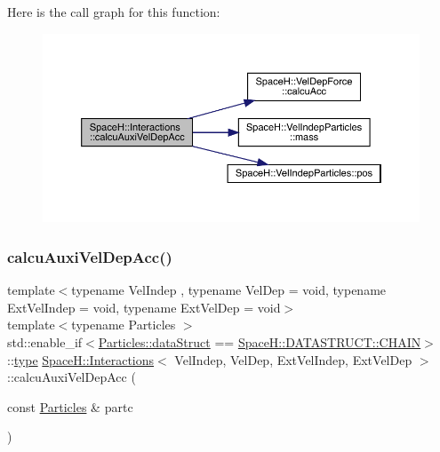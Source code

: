 Here is the call graph for this function\+:
\nopagebreak
\begin{figure}[H]
\begin{center}
\leavevmode
\includegraphics[width=350pt]{class_space_h_1_1_interactions_a99436e576da0455cd4ab795e3ccbc19a_cgraph}
\end{center}
\end{figure}
\mbox{\label{class_space_h_1_1_interactions_a738d79fa867f94cc9fcc5e0e017ed86b}} 
\subsubsection{\texorpdfstring{calcu\+Auxi\+Vel\+Dep\+Acc()}{calcuAuxiVelDepAcc()}\hspace{0.1cm}{\footnotesize\ttfamily [2/2]}}
{\footnotesize\ttfamily template$<$typename Vel\+Indep , typename Vel\+Dep  = void, typename Ext\+Vel\+Indep  = void, typename Ext\+Vel\+Dep  = void$>$ \\
template$<$typename Particles $>$ \\
std\+::enable\+\_\+if$<$\mbox{\hyperlink{class_space_h_1_1_vel_indep_particles_a066cbb08e0d444c27e2f71c30092e13f}{Particles\+::data\+Struct}} == \mbox{\hyperlink{namespace_space_h_a4782f089179a3c269891f02482b072dfa014d2cf3cdc3af6f4f92c09190860e33}{Space\+H\+::\+D\+A\+T\+A\+S\+T\+R\+U\+C\+T\+::\+C\+H\+A\+IN}}$>$\+::\mbox{\hyperlink{class_space_h_1_1_interactions_aa45fc9367bfa0b8693700525ffa2655f}{type}} \mbox{\hyperlink{class_space_h_1_1_interactions}{Space\+H\+::\+Interactions}}$<$ Vel\+Indep, Vel\+Dep, Ext\+Vel\+Indep, Ext\+Vel\+Dep $>$\+::calcu\+Auxi\+Vel\+Dep\+Acc (\begin{DoxyParamCaption}\item[{const \mbox{\hyperlink{struct_space_h_1_1_particles}{Particles}} \&}]{partc }\end{DoxyParamCaption})\hspace{0.3cm}{\ttfamily [inline]}}

